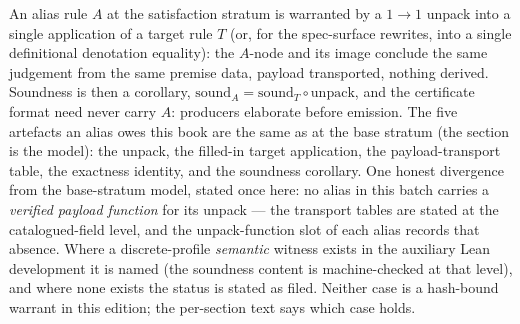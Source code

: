 

\begin{brecipe}\label{rec:sd-template}
An alias rule $A$ at the satisfaction stratum is warranted by a $1 \to 1$
unpack into a single application of a target rule $T$ (or, for the
spec-surface rewrites, into a single definitional denotation equality):
the $A$-node and its image conclude the same judgement from the same
premise data, payload transported, nothing derived. Soundness is then a
corollary, $\mathrm{sound}_A = \mathrm{sound}_T \circ \mathrm{unpack}$,
and the certificate format need never carry $A$: producers elaborate
before emission. The five artefacts an alias owes this book are the same
as at the base stratum (the  section is the model):
the unpack, the filled-in target application, the payload-transport
table, the exactness identity, and the soundness corollary. One honest
divergence from the base-stratum model, stated once here: no alias in
this batch carries a \emph{verified payload function} for its unpack
--- the transport tables are stated at the catalogued-field level,
and the unpack-function slot of each alias records that absence.
Where a discrete-profile \emph{semantic} witness exists in the
auxiliary Lean development it is named (the soundness content is
machine-checked at that level), and where none exists the status is
stated as filed. Neither case is a hash-bound warrant in this
edition; the per-section text says which case holds.
\end{brecipe}

